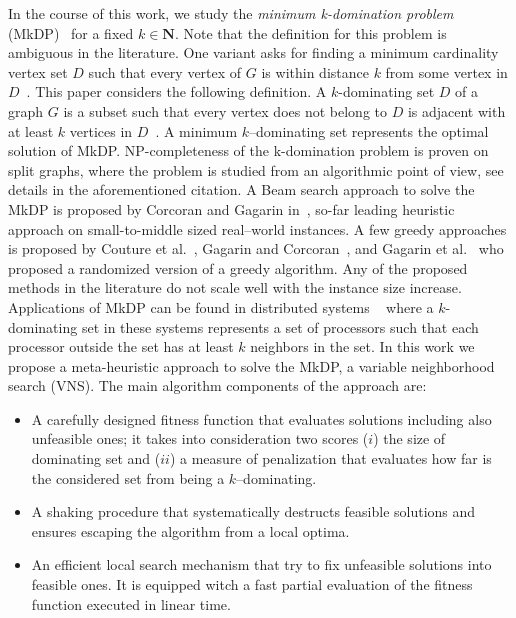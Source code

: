 \documentclass[dvipsnames,format=sigconf,anonymous=true,review=true]{acmart}
\begin{document}
In the course of this work, we study the \emph{minimum k-domination problem} (MkDP)~\cite{corcoran2021heuristics} for a fixed $k \in \mathbf{N}$.  Note that the definition for this problem is ambiguous in the literature. One variant asks for finding a minimum cardinality vertex set $ D$ such that every vertex of $G$ is within distance $k$ from some vertex in $D$~\cite{chang1983k}. 
This paper considers the following definition.  A $k$-dominating set  $D$ of a graph $G$ is a subset such that every vertex does not belong to $D$ is adjacent with at least $k$ vertices in  $D$~\cite{lan2013algorithmic}. A minimum $k$--dominating set represents the optimal solution of MkDP.  NP-completeness of the k-domination problem is proven on split graphs, where the problem is studied from an algorithmic point of view, see details in the aforementioned citation. A Beam search approach to solve the MkDP is proposed by Corcoran and Gagarin   in~\cite{corcoran2021heuristics}, so-far leading heuristic approach on small-to-middle sized real--world instances. A few greedy approaches is proposed by Couture et al.~\cite{couture2006incremental}, Gagarin and Corcoran~\cite{gagarin2018multiple}, and  Gagarin et al.~\cite{gagarin2013randomized} who proposed a randomized version of a greedy algorithm. Any of the proposed methods in the literature do not scale well with the instance size increase.   
Applications of MkDP can be found in  distributed systems  ~\cite{wang2013minimising} where  a $k$-dominating set in these systems represents a set of processors such that each processor outside the set has at least $k$ neighbors in the set.
In this work we propose a meta-heuristic approach to solve the MkDP, a variable neighborhood search (VNS). The main algorithm components of the approach are:
\begin{itemize}
	\item A carefully designed fitness function that evaluates solutions  including also unfeasible ones; it takes into consideration two scores ($i$) the size of dominating set and ($ii$) a measure of penalization that evaluates how far is the considered set from being a $k$--dominating. 
	\item A shaking procedure that systematically destructs feasible solutions and ensures escaping the algorithm from a local optima.
	\item An efficient local search mechanism that try to fix unfeasible solutions into feasible ones. It is equipped witch a fast partial evaluation of the fitness function executed in linear time.
 
\end{itemize}
\end{document}
